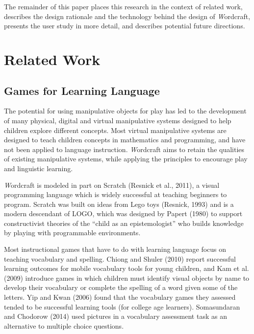 \documentclass{sigchi-ext}
\begin{document}
The remainder of this paper places this research in the context of related work, describes the design rationale and the technology behind the design of \emph Wordcraft, presents the user study in more detail, and describes potential future directions.

\section{Related Work}
\subsection{Games for Learning Language}
The potential for using manipulative objects for play has led to the development of many physical, digital and virtual manipulative systems designed to help children explore different concepts. Most virtual manipulative systems are designed to teach children concepts in mathematics and programming, and have not been applied to language instruction. \emph Wordcraft aims to retain the qualities of existing manipulative systems, while applying the principles to encourage play and linguistic learning.

\emph Wordcraft is modeled in part on Scratch (Resnick et al., 2011), a visual programming language which is widely successful at teaching beginners to program.  Scratch was built on ideas from Lego toys (Resnick, 1993) and is a modern descendant of LOGO, which was designed by Papert (1980) to support constructivist theories of the ``child as an epistemologist'' who builds knowledge by playing with programmable environments.

Most instructional games that have to do with learning language focus on teaching vocabulary and spelling.  Chiong and Shuler (2010) report successful learning outcomes for mobile vocabulary tools for young children, and Kam et al. (2009) introduce games in which children must identify visual objects by name to develop their vocabulary or complete the spelling of a word given some of the letters.  Yip and Kwan (2006) found that the vocabulary games they assessed tended to be successful learning tools (for college age learners).  Somasundaran and Chodorow (2014) used pictures in a vocabulary assessment task as an alternative to multiple choice questions.
\end{document}
